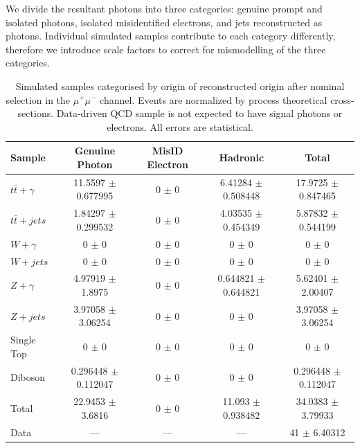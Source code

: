 We divide the resultant photons into three categories: genuine prompt and isolated photons, isolated misidentified electrons, and jets reconstructed as photons. Individual simulated samples contribute to each category differently, therefore we introduce scale factors to correct for mismodelling of the three categories. 

\begin{table}
\begin{center}
\begin{tabular}{l|ccc|c}
\hline
	\textbf{Sample} & \textbf{Genuine Photon} & \textbf{MisID Electron} & \textbf{Hadronic} & \textbf{Total} \\
\hline
$t\bar{t}+\gamma$  & 11.5597 $\pm$ 0.677995 & 0 $\pm$ 0 & 6.41284 $\pm$ 0.508448 & 17.9725 $\pm$ 0.847465 \\
$t\bar{t}+jets$  & 1.84297 $\pm$ 0.299532 & 0 $\pm$ 0 & 4.03535 $\pm$ 0.454349 & 5.87832 $\pm$ 0.544199 \\
$W+\gamma$  & 0 $\pm$ 0 & 0 $\pm$ 0 & 0 $\pm$ 0 & 0 $\pm$ 0 \\
$W+jets$  & 0 $\pm$ 0 & 0 $\pm$ 0 & 0 $\pm$ 0 & 0 $\pm$ 0 \\
$Z+\gamma$  & 4.97919 $\pm$ 1.8975 & 0 $\pm$ 0 & 0.644821 $\pm$ 0.644821 & 5.62401 $\pm$ 2.00407 \\
$Z+jets$  & 3.97058 $\pm$ 3.06254 & 0 $\pm$ 0 & 0 $\pm$ 0 & 3.97058 $\pm$ 3.06254 \\
Single Top  & 0 $\pm$ 0 & 0 $\pm$ 0 & 0 $\pm$ 0 & 0 $\pm$ 0 \\
Diboson  & 0.296448 $\pm$ 0.112047 & 0 $\pm$ 0 & 0 $\pm$ 0 & 0.296448 $\pm$ 0.112047 \\
\hline
Total  & 22.9453 $\pm$ 3.6816 & 0 $\pm$ 0 & 11.093 $\pm$ 0.938482 & 34.0383 $\pm$ 3.79933 \\
Data  & --- & --- & --- & 41 $\pm$ 6.40312 \\
\hline	
\end{tabular}
\end{center}
\caption{Simulated samples categorised by origin of reconstructed origin after nominal selection in the $\mu^+\mu^-$ channel. Events are normalized by process theoretical cross-sections. Data-driven QCD sample is not expected to have signal photons or electrons. All errors are statistical.}
\label{tab-SigPhotonsMuMu}
\end{table}	

